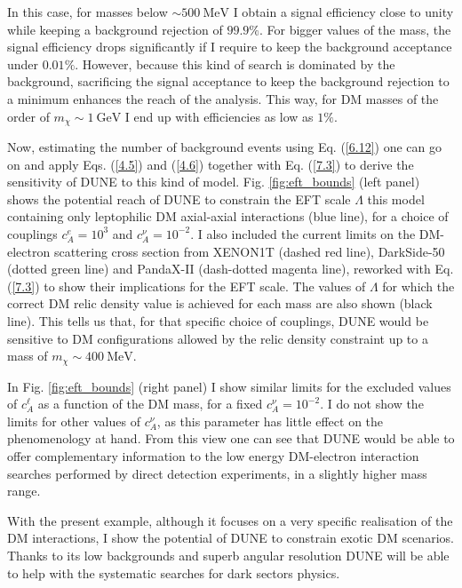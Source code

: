 In this case, for masses below $\sim 500 \ \mathrm{MeV}$ I obtain a signal efficiency close to unity while keeping a background rejection of $99.9\%$. For bigger values of the mass, the signal efficiency drops significantly if I require to keep the background acceptance under $0.01\%$. However, because this kind of search is dominated by the background, sacrificing the signal acceptance to keep the background rejection to a minimum enhances the reach of the analysis. This way, for DM masses of the order of $m_{\chi} \sim 1 \ \mathrm{GeV}$ I end up with efficiencies as low as $1\%$.

Now, estimating the number of background events using Eq. (\ref{6.12}) one can go on and apply Eqs. (\ref{4.5}) and (\ref{4.6}) together with Eq. (\ref{7.3}) to derive the sensitivity of DUNE to this kind of model. Fig. \ref{fig:eft_bounds} (left panel) shows the potential reach of DUNE to constrain the EFT scale $\Lambda$ this model containing only leptophilic DM axial-axial interactions (blue line), for a choice of couplings $c_{A}^{e} = 10^{3}$ and $c_{A}^{\nu} = 10^{-2}$. I also included the current limits on the DM-electron scattering cross section from XENON1T \cite{XENON2019} (dashed red line), DarkSide-50 \cite{DarkSide2022} (dotted green line) and PandaX-II \cite{PandaX-II2021} (dash-dotted magenta line), reworked with Eq. (\ref{7.3}) to show their implications for the EFT scale. The values of $\Lambda$ for which the correct DM relic density value is achieved for each mass are also shown (black line). This tells us that, for that specific choice of couplings, DUNE would be sensitive to DM configurations allowed by the relic density constraint up to a mass of $m_{\chi} \sim 400 \ \mathrm{MeV}$.

In Fig. \ref{fig:eft_bounds} (right panel) I show similar limits for the excluded values of $c_{A}^{\ell}$ as a function of the DM mass, for a fixed $c_{A}^{\nu}=10^{-2}$. I do not show the limits for other values of $c_{A}^{\nu}$, as this parameter has little effect on the phenomenology at hand. From this view one can see that DUNE would be able to offer complementary information to the low energy DM-electron interaction searches performed by direct detection experiments, in a slightly higher mass range.

With the present example, although it focuses on a very specific realisation of the DM interactions, I show the potential of DUNE to constrain exotic DM scenarios. Thanks to its low backgrounds and superb angular resolution DUNE will be able to help with the systematic searches for dark sectors physics.

